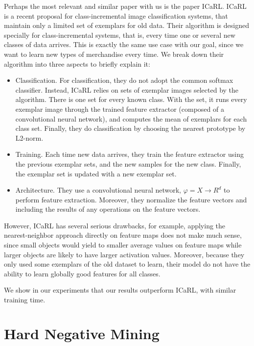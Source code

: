 Perhaps the most relevant and similar paper with us is the paper ICaRL\cite{rebuffi2017icarl}. ICaRL\cite{rebuffi2017icarl} is a recent proposal for class-incremental image classification systems, that maintain only a limited set of exemplars for old data. Their algorithm is designed specially for class-incremental systems, that is, every time one or several new classes of data arrives. This is exactly the same use case with our goal, since we want to learn new types of merchandise every time. We break down their algorithm into three aspects to briefly explain it:
\begin{itemize}
	\item Classification. For classification, they do not adopt the common softmax classifier. Instead, ICaRL relies on sets of exemplar images selected by the algorithm. There is one set for every known class. With the set, it runs every exemplar image through the trained feature extractor (composed of a convolutional neural network), and computes the mean of exemplars for each class set. Finally, they do classification by choosing the nearest prototype by L2-norm.
	\item Training. Each time new data arrives, they train the feature extractor using the previous exemplar sets, and the new samples for the new class. Finally, the exemplar set is updated with a new exemplar set.
	\item Architecture. They use a convolutional neural network, $\varphi=X\to R^d$ to perform feature extraction. Moreover, they normalize the feature vectors and including the results of any operations on the feature vectors.
\end{itemize}
However, ICaRL has several serious drawbacks, for example, applying the nearest-neighbor approach directly on feature maps does not make much sense, since small objects would yield to smaller average values on feature maps while larger objects are likely to have larger activation values. Moreover, because they only used some exemplars of the old dataset to learn, their model do not have the ability to learn globally good features for all classes.

We show in our experiments that our results outperform ICaRL, with similar training time.

\section{Hard Negative Mining}

